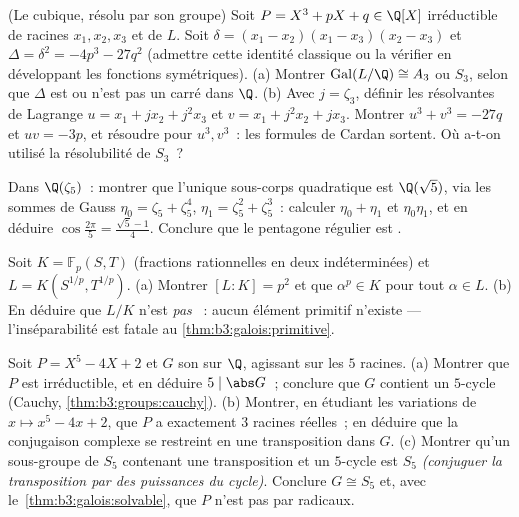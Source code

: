 \begin{exercise}[$\star\star$]\label{exo:b3:galois:8}
(Le cubique, résolu par son groupe) Soit $P = X^3 + pX + q \in
\Q[X]$ irréductible de racines $x_1, x_2, x_3$ et de  $L$. Soit $\delta = (x_1 - x_2)(x_1 - x_3)(x_2 -
x_3)$ et $\Delta = \delta^2 = -4p^3 - 27q^2$ (admettre cette
identité classique ou la vérifier en développant les fonctions
symétriques).
(a) Montrer $\operatorname{Gal}(L/\Q) \cong A_3$ ou $S_3$,
selon que $\Delta$ est ou n'est pas un carré dans $\Q$.
(b) Avec $j = \zeta_3$, définir les résolvantes de Lagrange $u
= x_1 + jx_2 + j^2x_3$ et $v = x_1 + j^2x_2 + jx_3$. Montrer
$u^3 + v^3 = -27q$ et $uv = -3p$, et résoudre pour $u^3, v^3$~:
les formules de Cardan sortent. Où a-t-on utilisé la
résolubilité de $S_3$~?
\end{exercise}

\begin{exercise}[$\star\star$]\label{exo:b3:galois:9}
Dans $\Q(\zeta_5)$~: montrer que l'unique sous-corps
quadratique est $\Q(\sqrt5)$, via les sommes de Gauss $\eta_0
= \zeta_5 + \zeta_5^4$, $\eta_1 = \zeta_5^2 + \zeta_5^3$~:
calculer $\eta_0 + \eta_1$ et $\eta_0\eta_1$, et en déduire
$\cos\frac{2\pi}5 = \frac{\sqrt5 - 1}4$. Conclure que le
pentagone régulier est .
\end{exercise}

\begin{exercise}[$\star\star\star$]\label{exo:b3:galois:10}
Soit $K = \mathbb F_p(S, T)$ (fractions rationnelles en deux
indéterminées) et $L = K(S^{1/p}, T^{1/p})$.
(a) Montrer $[L:K] = p^2$ et que $\alpha^p \in K$ pour tout
$\alpha \in L$.
(b) En déduire que $L/K$ n'est \emph{pas} ~: aucun
élément primitif n'existe --- l'inséparabilité est fatale au
\cref{thm:b3:galois:primitive}.
\end{exercise}

\begin{exercise}[$\star\star\star$]\label{exo:b3:galois:11}
Soit $P = X^5 - 4X + 2$ et $G$ son  sur $\Q$,
agissant sur les $5$ racines.
(a) Montrer que $P$ est irréductible, et en déduire $5 \mid
\abs G$~; conclure que $G$ contient un $5$-cycle (Cauchy,
\cref{thm:b3:groups:cauchy}).
(b) Montrer, en étudiant les variations de $x \mapsto x^5 - 4x
+ 2$, que $P$ a exactement $3$ racines réelles~; en déduire que
la conjugaison complexe se restreint en une transposition dans
$G$.
(c) Montrer qu'un sous-groupe de $S_5$ contenant une
transposition et un $5$-cycle est $S_5$ \emph{(conjuguer la
transposition par des puissances du cycle)}. Conclure $G \cong
S_5$ et, avec le~\cref{thm:b3:galois:solvable}, que $P$ n'est
pas  par radicaux.
\end{exercise}

